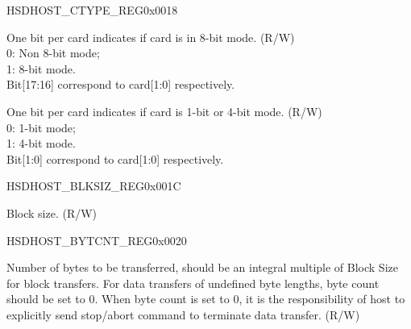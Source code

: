 \begin{register}{H}{SDHOST\_CTYPE\_REG}{0x{}0018}\label{regdesc:CTYPEREG}
%
%
%
%
\regnewline%
\begin{regdesc}\begin{reglist}
\item [SDHOST\_CARD\_WIDTH8]One bit per card indicates if card is in 8-bit mode. (R/W)\\
0: Non 8-bit mode;\\
1: 8-bit mode.\\
Bit[17:16] correspond to card[1:0] respectively.
\item [SDHOST\_CARD\_WIDTH4]One bit per card indicates if card is 1-bit or 4-bit mode. (R/W)\\
0: 1-bit mode;\\
1: 4-bit mode.\\
Bit[1:0] correspond to card[1:0] respectively.
\end{reglist}\end{regdesc}
\end{register}


\begin{register}{H}{SDHOST\_BLKSIZ\_REG}{0x{}001C}\label{regdesc:BLKSIZREG}
%
%
\regnewline%
\begin{regdesc}\begin{reglist}
\item [SDHOST\_BLOCK\_SIZE]Block size. (R/W)
\end{reglist}\end{regdesc}
\end{register}


\begin{register}{H}{SDHOST\_BYTCNT\_REG}{0x{}0020}\label{regdesc:BYTCNTREG}
%
\regnewline%
\begin{regdesc}\begin{reglist}
\item [SDHOST\_BYTCNT\_REG]Number of bytes to be transferred, should be an integral multiple of Block Size for block transfers. For data transfers of undefined byte lengths, byte count should be set to 0. When byte count is set to 0, it is the responsibility of host to explicitly send stop/abort command to terminate data transfer. (R/W)
\end{reglist}\end{regdesc}
\end{register}


